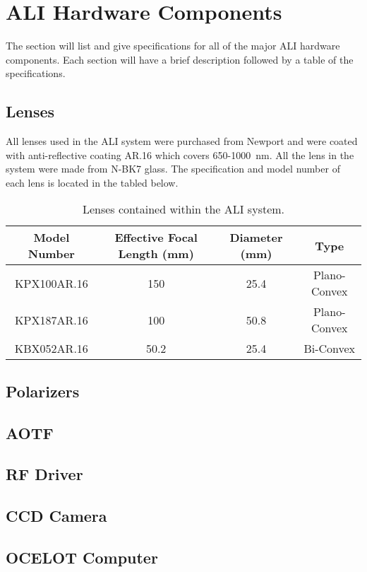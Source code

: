 \chapter{ALI Hardware Components}

The section will list and give specifications for all of the major ALI hardware components. Each section will have a brief description followed by a table of the specifications.

\section{Lenses}

All lenses used in the ALI system were purchased from Newport and were coated with anti-reflective coating AR.16 which covers 650-1000~nm. All the lens in the system were made from N-BK7 glass. The specification and model number of each lens is located in the tabled below.

\begin{table}
    \begin{center}
    \begin{tabular}{|c|c|c|c|}
    \hline
    Model Number & Effective Focal Length (mm) & Diameter (mm) & Type  \\
    \hline
    KPX100AR.16 & 150 & 25.4 & Plano-Convex \\
    \hline
    KPX187AR.16 & 100 & 50.8 & Plano-Convex \\
    \hline
    KBX052AR.16 & 50.2 & 25.4 & Bi-Convex \\
    \hline
    \end{tabular}
    \end{center}
    \caption[ALI System Lenses]{Lenses contained within the ALI system.}
    \label{tab:A.1:AliLenes}
\end{table}

\section{Polarizers}

\section{AOTF}

\section{RF Driver}

\section{CCD Camera}

\section{OCELOT Computer}



